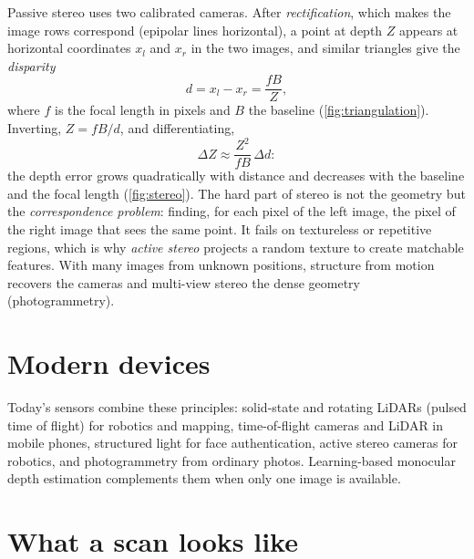 Passive stereo uses two calibrated cameras. After \emph{rectification}, which makes the image
rows correspond (epipolar lines horizontal), a point at depth $Z$ appears at horizontal
coordinates $x_l$ and $x_r$ in the two images, and similar triangles give the \emph{disparity}
\begin{equation}
d=x_l-x_r=\frac{fB}{Z},
\end{equation}
where $f$ is the focal length in pixels and $B$ the baseline (\cref{fig:triangulation}). Inverting,
$Z=fB/d$, and differentiating,
\begin{equation}
\Delta Z\approx\frac{Z^2}{fB}\,\Delta d :
\end{equation}
the depth error grows quadratically with distance and decreases with the baseline and the focal
length (\cref{fig:stereo}). The hard part of stereo is not the geometry but the \emph{correspondence
problem}: finding, for each pixel of the left image, the pixel of the right image that sees the
same point. It fails on textureless or repetitive regions, which is why \emph{active stereo}
projects a random texture to create matchable features. With many images from unknown positions,
structure from motion recovers the cameras and multi-view stereo the dense geometry
(photogrammetry).


\section{Modern devices}

Today's sensors combine these principles: solid-state and rotating LiDARs (pulsed time of flight)
for robotics and mapping, time-of-flight cameras and LiDAR in mobile phones, structured light for
face authentication, active stereo cameras for robotics, and photogrammetry from ordinary photos.
Learning-based monocular depth estimation complements them when only one image is available.

\section{What a scan looks like}

